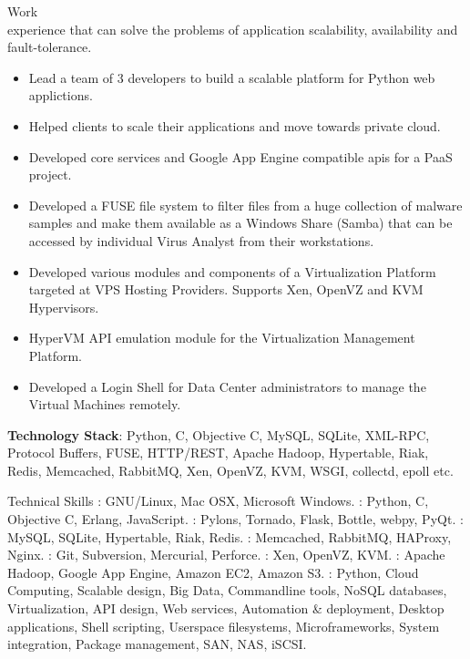 \documentclass{resume}
\begin{document}
\begin{category}{Work \\experience}
  that can solve the problems of application scalability, availability and fault-tolerance.
  \begin{itemize} 
  \item Lead a team of 3 developers to build a scalable platform for Python web applictions.
  \item Helped clients to scale their applications and move towards private cloud.
  \item Developed core services and Google App Engine compatible apis for a PaaS project.
  \item Developed a FUSE file system to filter files from a huge collection of malware samples 
  and make them available as a Windows Share (Samba) that can be accessed by individual 
  Virus Analyst from their workstations.
  \item Developed various modules and components of a Virtualization Platform targeted at VPS Hosting
  Providers. Supports Xen, OpenVZ and KVM Hypervisors.
  \item HyperVM API emulation module for the Virtualization Management Platform.
  \item Developed a Login Shell for Data Center administrators to manage the
    Virtual Machines remotely.
  \end{itemize}
  \citemnobullet \textbf{Technology Stack}: Python, C, Objective C, MySQL, SQLite, XML-RPC,
  Protocol Buffers, FUSE, HTTP/REST, Apache Hadoop, Hypertable, Riak, Redis,
  Memcached, RabbitMQ, Xen, OpenVZ, KVM, WSGI, collectd, epoll etc.
\end{category}

\begin{category}{Technical Skills}
  : GNU/Linux, Mac OSX, Microsoft Windows.
  : Python, C, Objective
  C, Erlang, JavaScript.
  : Pylons, Tornado, Flask, Bottle, webpy, PyQt.
  : MySQL, SQLite, Hypertable, Riak, Redis.
  : Memcached, RabbitMQ, HAProxy, Nginx.
  : Git, Subversion, Mercurial,
  Perforce.
  : Xen, OpenVZ, KVM.
  : Apache Hadoop, Google App Engine, Amazon EC2, Amazon S3.
  : Python, Cloud Computing, Scalable design, Big Data, Commandline 
  tools, NoSQL databases, Virtualization, API design, Web services, Automation \& deployment, 
  Desktop applications, Shell scripting, Userspace filesystems, Microframeworks, System integration, 
  Package management, SAN, NAS, iSCSI.
\end{category}
\end{document}
